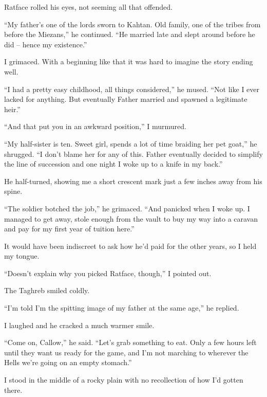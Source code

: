 \documentclass[12pt, openany]{book}
\begin{document}
Ratface rolled his eyes, not seeming all that offended.

“My father’s one of the lords sworn to Kahtan. Old family, one of the tribes from before the Miezans,” he continued. “He married late and slept around before he did – hence my existence.”

I grimaced. With a beginning like that it was hard to imagine the story ending well.

“I had a pretty easy childhood, all things considered,” he mused. “Not like I ever lacked for anything. But eventually Father married and spawned a legitimate heir.”

“And that put you in an awkward position,” I murmured.

“My half-sister is ten. Sweet girl, spends a lot of time braiding her pet goat,” he shrugged. “I don’t blame her for any of this. Father eventually decided to simplify the line of succession and one night I woke up to a knife in my back.”

He half-turned, showing me a short crescent mark just a few inches away from his spine.

“The soldier botched the job,” he grimaced. “And panicked when I woke up. I managed to get away, stole enough from the vault to buy my way into a caravan and pay for my first year of tuition here.”

It would have been indiscreet to ask how he’d paid for the other years, so I held my tongue.

“Doesn’t explain why you picked Ratface, though,” I pointed out.

The Taghreb smiled coldly.

“I’m told I’m the spitting image of my father at the same age,” he replied.

I laughed and he cracked a much warmer smile.

“Come on, Callow,” he said. “Let’s grab something to eat. Only a few hours left until they want us ready for the game, and I’m not marching to wherever the Hells we’re going on an empty stomach.”

I stood in the middle of a rocky plain with no recollection of how I’d gotten there.
\end{document}
